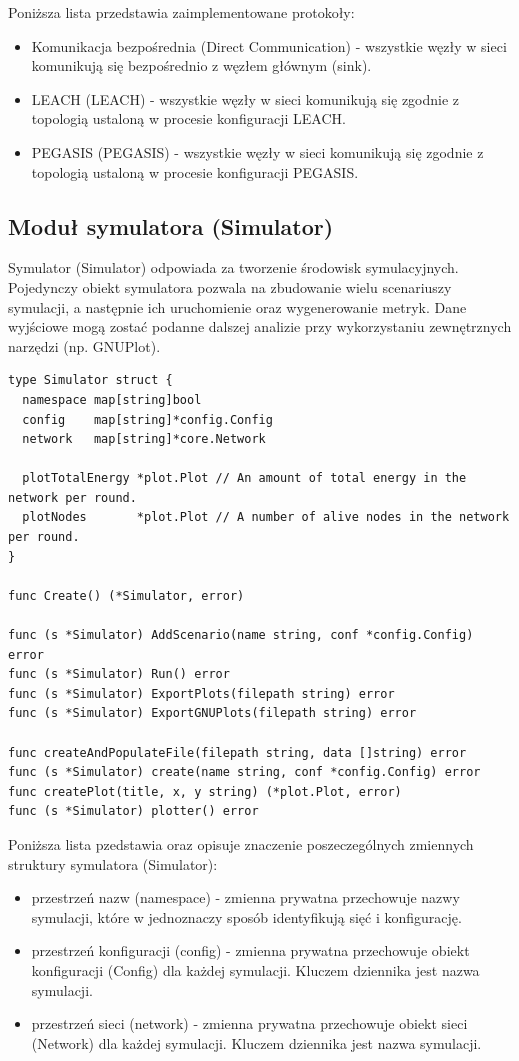 \documentclass[a4paper,12pt,twoside,openany]{report}
\begin{document}
Poniższa lista przedstawia zaimplementowane protokoły:

\begin{itemize}
 \item Komunikacja bezpośrednia	(Direct Communication) - wszystkie węzły w sieci komunikują się bezpośrednio z węzłem głównym (sink).
 \item LEACH (LEACH) - wszystkie węzły w sieci komunikują się zgodnie z topologią ustaloną w procesie konfiguracji LEACH.
 \item PEGASIS (PEGASIS) - wszystkie węzły w sieci komunikują się zgodnie z topologią ustaloną w procesie konfiguracji PEGASIS.
\end{itemize}

\subsection{Moduł symulatora (Simulator)}

Symulator (Simulator) odpowiada za tworzenie środowisk symulacyjnych.
Pojedynczy obiekt symulatora pozwala na zbudowanie wielu scenariuszy symulacji, a następnie ich uruchomienie oraz
wygenerowanie metryk. Dane wyjściowe mogą zostać podanne dalszej analizie przy wykorzystaniu zewnętrznych narzędzi (np. GNUPlot).

\begin{lstlisting}
type Simulator struct {
  namespace map[string]bool
  config    map[string]*config.Config
  network   map[string]*core.Network

  plotTotalEnergy *plot.Plot // An amount of total energy in the network per round.
  plotNodes       *plot.Plot // A number of alive nodes in the network per round.
}

func Create() (*Simulator, error)

func (s *Simulator) AddScenario(name string, conf *config.Config) error
func (s *Simulator) Run() error
func (s *Simulator) ExportPlots(filepath string) error
func (s *Simulator) ExportGNUPlots(filepath string) error

func createAndPopulateFile(filepath string, data []string) error
func (s *Simulator) create(name string, conf *config.Config) error
func createPlot(title, x, y string) (*plot.Plot, error)
func (s *Simulator) plotter() error
\end{lstlisting}

Poniższa lista pzedstawia oraz opisuje znaczenie poszeczególnych zmiennych struktury symulatora (Simulator):

\begin{itemize}
 \item przestrzeń nazw (namespace) - zmienna prywatna przechowuje nazwy symulacji, które w jednoznaczy sposób identyfikują sięć i konfigurację.
 \item przestrzeń konfiguracji (config) - zmienna prywatna przechowuje obiekt konfiguracji (Config) dla każdej symulacji. Kluczem dziennika jest nazwa symulacji.
 \item przestrzeń sieci (network) - zmienna prywatna przechowuje obiekt sieci (Network) dla każdej symulacji. Kluczem dziennika jest nazwa symulacji.
\end{itemize}
\end{document}
